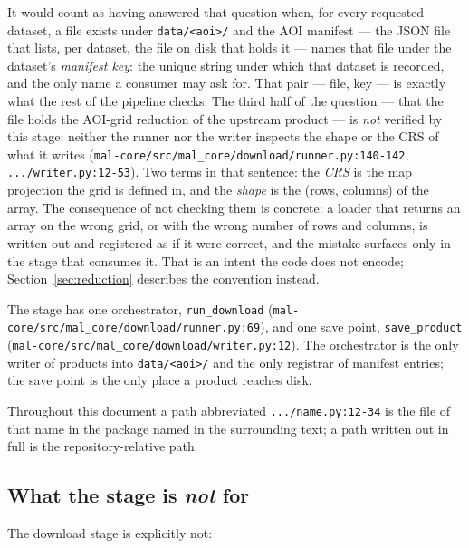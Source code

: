 \documentclass[11pt,a4paper]{article}
\newcommand{\code}[1]{\texttt{#1}}
\begin{document}
It would count as having answered that question when, for every requested
dataset, a file exists under \code{data/<aoi>/} and the AOI manifest --- the
JSON file that lists, per dataset, the file on disk that holds it --- names
that file under the dataset's \emph{manifest key}: the unique string under
which that dataset is recorded, and the only name a consumer may ask for.
That pair --- file, key --- is exactly what the rest of the pipeline checks.
The third half of the question --- that the file holds the AOI-grid reduction
of the upstream product --- is \emph{not} verified by this stage: neither the
runner nor the writer inspects the shape or the CRS of what it writes
(\code{mal-core/src/mal\_core/download/runner.py:140-142},
\code{.../writer.py:12-53}). Two terms in that sentence: the \emph{CRS} is
the map projection the grid is defined in, and the \emph{shape} is the
(rows, columns) of the array. The consequence of not checking them is
concrete: a loader that returns an array on the wrong grid, or with the
wrong number of rows and columns, is written out and registered as if it
were correct, and the mistake surfaces only in the stage that consumes it.
That is an intent the code does not encode; Section~\ref{sec:reduction}
describes the convention instead.

The stage has one orchestrator, \code{run\_download}
(\code{mal-core/src/mal\_core/download/runner.py:69}), and one save point,
\code{save\_product}
(\code{mal-core/src/mal\_core/download/writer.py:12}). The orchestrator is the
only writer of products into \code{data/<aoi>/} and the only registrar of
manifest entries; the save point is the only place a product reaches disk.

Throughout this document a path abbreviated \code{.../name.py:12-34} is the
file of that name in the package named in the surrounding text; a path
written out in full is the repository-relative path.

\subsection{What the stage is \emph{not} for}

The download stage is explicitly not:
\end{document}

